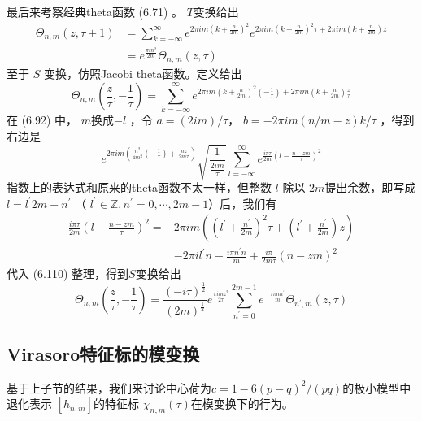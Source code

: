 最后来考察经典theta函数 (6.71) 。 $T $变换给出
\begin{equation}
	\begin{aligned} \Theta_{n, m}(z, \tau+1) &=\sum_{k=-\infty}^{\infty} e^{2 \pi i m\left(k+\frac{n}{2 m}\right)^{2}} e^{2 \pi i m\left(k+\frac{n}{2 m}\right)^{2} \tau+2 \pi i m\left(k+\frac{n}{2 m}\right) z} \\ &=e^{\frac{\pi i n^{2}}{2 m}} \Theta_{n, m}(z, \tau) \end{aligned}
\end{equation}
至于 $S$ 变换，仿照Jacobi theta函数。定义给出
\begin{equation}
	\Theta_{n, m}\left(\frac{z}{\tau},-\frac{1}{\tau}\right)=\sum_{k=-\infty}^{\infty} e^{2 \pi i m\left(k+\frac{n}{2 m}\right)^{2}\left(-\frac{1}{\tau}\right)+2 \pi i m\left(k+\frac{n}{2 m}\right) \frac{z}{\tau}} 
\end{equation}
在 (6.92) 中， $m $换成$ -l$ ，令 $a=(2im)/\tau $， $b=-2\pi i m(n/m-z)k/\tau$ ，得到右边是
\begin{equation}
e^{2 \pi i m\left(\frac{n^{2}}{4 m^2}\left(-\frac{1}{\tau}\right)+\frac{n z}{2 m \tau}\right)} \sqrt{\frac{1}{\frac{2 i m}{\tau}}} \sum_{l=-\infty}^{\infty} e^{\frac{i \pi \tau}{2 m}\left(l-\frac{n-z m}{\tau}\right)^{2}}
\end{equation} 
指数上的表达式和原来的theta函数不太一样，但整数 $l$ 除以 $2m $提出余数，即写成 $l=l^{\prime} 2 m+n^{\prime}$ （ $l^{\prime} \in \mathbb{Z}, n^{\prime}=0, \cdots, 2 m-1 $）后，我们有
\begin{equation}
	\begin{aligned} \frac{i \pi \tau}{2 m}\left(l-\frac{n-z m}{\tau}\right)^{2}=& 2 \pi i m\left(\left(l^{\prime}+\frac{n^{\prime}}{2 m}\right)^{2}\tau+\left(l^{\prime}+\frac{n^{\prime}}{2 m}\right) z\right) \\ &-2 \pi i l^{\prime} n-\frac{i \pi n^{\prime} n}{m}+\frac{i \pi }{2 m \tau}(n-z m)^{2} \end{aligned}
\end{equation}
代入 (6.110) 整理，得到$ S $变换给出
\begin{equation}
	\Theta_{n, m}\left(\frac{z}{\tau},-\frac{1}{\tau}\right)=\frac{(-i \tau)^{\frac{1}{2}}}{(2 m)^{\frac{1}{2}}} e^{\frac{\pi i m z^{2}}{2\tau}} \sum_{n^{\prime}=0}^{2 m-1} e^{-\frac{i \pi n n^{\prime}}{m}} \Theta_{n^{\prime}, m}(z, \tau)
\end{equation} 

\subsection{Virasoro特征标的模变换}
基于上子节的结果，我们来讨论中心荷为$ c=1- 6(p-q)^{2} /(p q) $的极小模型中退化表示 $\left[h_{n, m}\right] $的特征标 $\chi_{n, m}(\tau) $在模变换下的行为。


